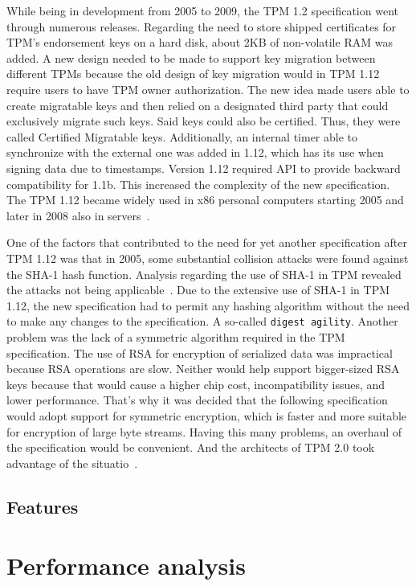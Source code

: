 While being in development from 2005 to 2009, the TPM 1.2 specification went through numerous releases. Regarding the need to store shipped certificates for TPM's endorsement keys on a hard disk, about 2KB of non-volatile RAM was added. A new design needed to be made to support key migration between different TPMs because the old design of key migration would in TPM 1.12 require users to have TPM owner authorization. The new idea made users able to create migratable keys and then relied on a designated third party that could exclusively migrate such keys. Said keys could also be certified. Thus, they were called Certified Migratable keys. Additionally, an internal timer able to synchronize with the external one was added in 1.12, which has its use when signing data due to timestamps. Version 1.12 required API to provide backward compatibility for 1.1b. This increased the complexity of the new specification. The TPM 1.12 became widely used in x86 personal computers starting 2005 and later in 2008 also in servers~\cite{arthur2015practical}.

One of the factors that contributed to the need for yet another specification after TPM 1.12 was that in 2005, some substantial collision attacks were found against the SHA-1 hash function. Analysis regarding the use of SHA-1 in TPM revealed the attacks not being applicable~\cite{tcg_tpm1.12_sha-1_uses}. Due to the extensive use of SHA-1 in TPM 1.12, the new specification had to permit any hashing algorithm without the need to make any changes to the specification. A so-called \texttt{digest agility}. Another problem was the lack of a symmetric algorithm required in the TPM specification. The use of RSA for encryption of serialized data was impractical because RSA operations are slow. Neither would help support bigger-sized RSA keys because that would cause a higher chip cost, incompatibility issues, and lower performance. That's why it was decided that the following specification would adopt support for symmetric encryption, which is faster and more suitable for encryption of large byte streams. Having this many problems, an overhaul of the specification would be convenient. And the architects of TPM 2.0 took advantage of the situatio~\cite{arthur2015practical}.


\subsection{Features}


\section{Performance analysis}
